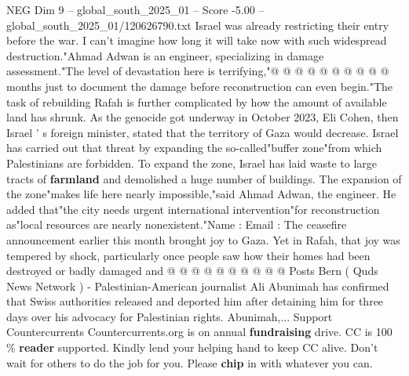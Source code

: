 \begin{textsample}{NEG Dim 9 – global\_south\_2025\_01 – Score -5.00 – global\_south\_2025\_01/120626790.txt}
Israel was already restricting their entry before the war.
I can't imagine how long it will take now with such widespread destruction."Ahmad Adwan is an engineer, specializing in damage assessment."The level of devastation here is terrifying,"@ @ @ @ @ @ @ @ @ @ months just to document the damage before reconstruction can even begin."The task of rebuilding Rafah is further complicated by how the amount of available land has shrunk.
As the genocide got underway in October 2023, Eli Cohen, then Israel ' s foreign minister, stated that the territory of Gaza would decrease.
Israel has carried out that threat by expanding the so-called"buffer zone"from which Palestinians are forbidden.
To expand the zone, Israel has laid waste to large tracts of \textbf{farmland} and demolished a huge number of buildings.
The expansion of the zone"makes life here nearly impossible,"said Ahmad Adwan, the engineer.
He added that"the city needs urgent international intervention"for reconstruction as"local resources are nearly nonexistent."Name : Email : The ceasefire announcement earlier this month brought joy to Gaza.
Yet in Rafah, that joy was tempered by shock, particularly once people saw how their homes had been destroyed or badly damaged and @ @ @ @ @ @ @ @ @ @ Posts Bern ( Quds News Network ) - Palestinian-American journalist Ali Abunimah has confirmed that Swiss authorities released and deported him after detaining him for three days over his advocacy for Palestinian rights.
Abunimah,...
Support Countercurrents Countercurrents.org is on annual \textbf{fundraising} drive.
CC is 100 \% \textbf{reader} supported.
Kindly lend your helping hand to keep CC alive.
Don't wait for others to do the job for you.
Please \textbf{chip} in with whatever you can.

\end{textsample}
